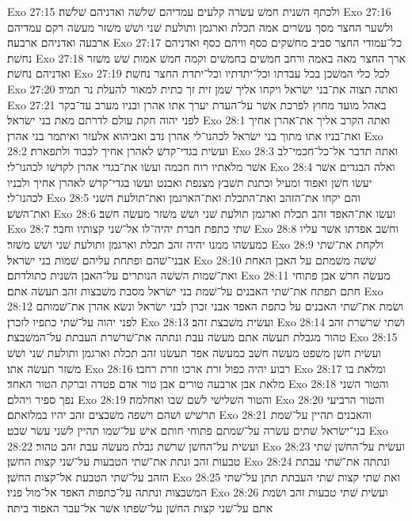 Exo 27:15  ולכתף השׁנית חמשׁ עשׂרה קלעים עמדיהם שׁלשׁה ואדניהם שׁלשׁה׃
Exo 27:16  ולשׁער החצר מסך עשׂרים אמה תכלת וארגמן ותולעת שׁני ושׁשׁ משׁזר מעשׂה רקם עמדיהם ארבעה ואדניהם ארבעה׃
Exo 27:17  כל־עמודי החצר סביב מחשׁקים כסף וויהם כסף ואדניהם נחשׁת׃
Exo 27:18  ארך החצר מאה באמה ורחב חמשׁים בחמשׁים וקמה חמשׁ אמות שׁשׁ משׁזר ואדניהם נחשׁת׃
Exo 27:19  לכל כלי המשׁכן בכל עבדתו וכל־יתדתיו וכל־יתדת החצר נחשׁת׃
Exo 27:20  ואתה תצוה את־בני ישׂראל ויקחו אליך שׁמן זית זך כתית למאור להעלת נר תמיד׃
Exo 27:21  באהל מועד מחוץ לפרכת אשׁר על־העדת יערך אתו אהרן ובניו מערב עד־בקר לפני יהוה חקת עולם לדרתם מאת בני ישׂראל׃
Exo 28:1  ואתה הקרב אליך את־אהרן אחיך ואת־בניו אתו מתוך בני ישׂראל לכהנו־לי אהרן נדב ואביהוא אלעזר ואיתמר בני אהרן׃
Exo 28:2  ועשׂית בגדי־קדשׁ לאהרן אחיך לכבוד ולתפארת׃
Exo 28:3  ואתה תדבר אל־כל־חכמי־לב אשׁר מלאתיו רוח חכמה ועשׂו את־בגדי אהרן לקדשׁו לכהנו־לי׃
Exo 28:4  ואלה הבגדים אשׁר יעשׂו חשׁן ואפוד ומעיל וכתנת תשׁבץ מצנפת ואבנט ועשׂו בגדי־קדשׁ לאהרן אחיך ולבניו לכהנו־לי׃
Exo 28:5  והם יקחו את־הזהב ואת־התכלת ואת־הארגמן ואת־תולעת השׁני ואת־השׁשׁ׃
Exo 28:6  ועשׂו את־האפד זהב תכלת וארגמן תולעת שׁני ושׁשׁ משׁזר מעשׂה חשׁב׃
Exo 28:7  שׁתי כתפת חברת יהיה־לו אל־שׁני קצותיו וחבר׃
Exo 28:8  וחשׁב אפדתו אשׁר עליו כמעשׂהו ממנו יהיה זהב תכלת וארגמן ותולעת שׁני ושׁשׁ משׁזר׃
Exo 28:9  ולקחת את־שׁתי אבני־שׁהם ופתחת עליהם שׁמות בני ישׂראל׃
Exo 28:10  שׁשׁה משׁמתם על האבן האחת ואת־שׁמות השׁשׁה הנותרים על־האבן השׁנית כתולדתם׃
Exo 28:11  מעשׂה חרשׁ אבן פתוחי חתם תפתח את־שׁתי האבנים על־שׁמת בני ישׂראל מסבת משׁבצות זהב תעשׂה אתם׃
Exo 28:12  ושׂמת את־שׁתי האבנים על כתפת האפד אבני זכרן לבני ישׂראל ונשׂא אהרן את־שׁמותם לפני יהוה על־שׁתי כתפיו לזכרן׃
Exo 28:13  ועשׂית משׁבצת זהב׃
Exo 28:14  ושׁתי שׁרשׁרת זהב טהור מגבלת תעשׂה אתם מעשׂה עבת ונתתה את־שׁרשׁרת העבתת על־המשׁבצת׃
Exo 28:15  ועשׂית חשׁן משׁפט מעשׂה חשׁב כמעשׂה אפד תעשׂנו זהב תכלת וארגמן ותולעת שׁני ושׁשׁ משׁזר תעשׂה אתו׃
Exo 28:16  רבוע יהיה כפול זרת ארכו וזרת רחבו׃
Exo 28:17  ומלאת בו מלאת אבן ארבעה טורים אבן טור אדם פטדה וברקת הטור האחד׃
Exo 28:18  והטור השׁני נפך ספיר ויהלם׃
Exo 28:19  והטור השׁלישׁי לשׁם שׁבו ואחלמה׃
Exo 28:20  והטור הרביעי תרשׁישׁ ושׁהם וישׁפה משׁבצים זהב יהיו במלואתם׃
Exo 28:21  והאבנים תהיין על־שׁמת בני־ישׂראל שׁתים עשׂרה על־שׁמתם פתוחי חותם אישׁ על־שׁמו תהיין לשׁני עשׂר שׁבט׃
Exo 28:22  ועשׂית על־החשׁן שׁרשׁת גבלת מעשׂה עבת זהב טהור׃
Exo 28:23  ועשׂית על־החשׁן שׁתי טבעות זהב ונתת את־שׁתי הטבעות על־שׁני קצות החשׁן׃
Exo 28:24  ונתתה את־שׁתי עבתת הזהב על־שׁתי הטבעת אל־קצות החשׁן׃
Exo 28:25  ואת שׁתי קצות שׁתי העבתת תתן על־שׁתי המשׁבצות ונתתה על־כתפות האפד אל־מול פניו׃
Exo 28:26  ועשׂית שׁתי טבעות זהב ושׂמת אתם על־שׁני קצות החשׁן על־שׂפתו אשׁר אל־עבר האפוד ביתה׃
